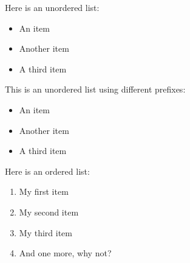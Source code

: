 \documentclass[10pt]{extarticle}
\date{}
\begin{document}

Here is an unordered list:

\begin{itemize}
\item An item
\item Another item
\item A third item
\end{itemize}

This is an unordered list using different prefixes:

\begin{itemize}
\item An item
\item Another item
\item A third item
\end{itemize}

Here is an ordered list:

\begin{enumerate}
\item My first item
\item My second item
\item My third item
\item And one more, why not?
\end{enumerate}

\end{document}
